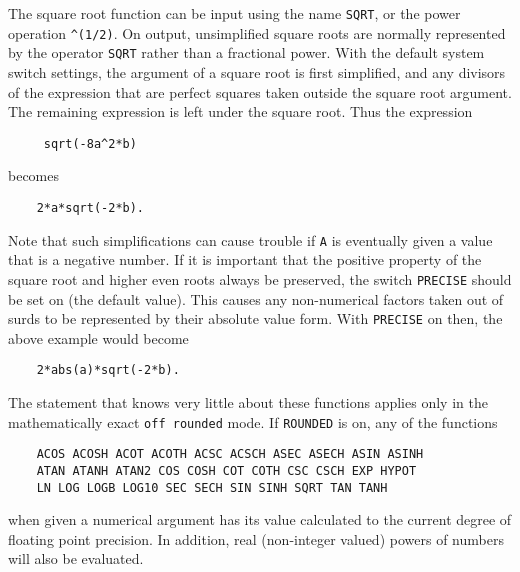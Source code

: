 The square root function can be input using the name {\tt SQRT}, or the
power operation {\tt \verb|^|(1/2)}.  On output, unsimplified square roots
are normally represented by the operator {\tt SQRT} rather than a
fractional power.  With the default system switch settings, the argument
of a square root is first simplified, and any divisors of the expression
that are perfect squares taken outside the square root argument.  The
remaining expression is left under the square root.
Thus the expression
\begin{verbatim}
	 sqrt(-8a^2*b)
 \end{verbatim}
becomes
\begin{verbatim}
	2*a*sqrt(-2*b).
\end{verbatim}

\hypertarget{switch:PRECISE}{}
Note that such simplifications can cause trouble if {\tt A} is eventually
given a value that is a negative number.  If it is important that the
positive property of the square root and higher even roots always be
preserved, the switch {\tt PRECISE} should be set on
(the default value).
This causes any non-numerical factors taken out of surds to be represented
by their absolute value form.
With %
{\tt PRECISE} on then, the above example would become
\begin{verbatim}
	2*abs(a)*sqrt(-2*b).
\end{verbatim}

The statement that {\REDUCE} knows very little about these functions
applies only in the mathematically exact {\tt off rounded} mode.  If
{\tt ROUNDED} is on, any of the functions
\begin{verbatim}
	ACOS ACOSH ACOT ACOTH ACSC ACSCH ASEC ASECH ASIN ASINH
	ATAN ATANH ATAN2 COS COSH COT COTH CSC CSCH EXP HYPOT
	LN LOG LOGB LOG10 SEC SECH SIN SINH SQRT TAN TANH
\end{verbatim}
when given a numerical argument has its value calculated to the current
degree of floating point precision.  In addition, real (non-integer
valued) powers of numbers will also be evaluated.

